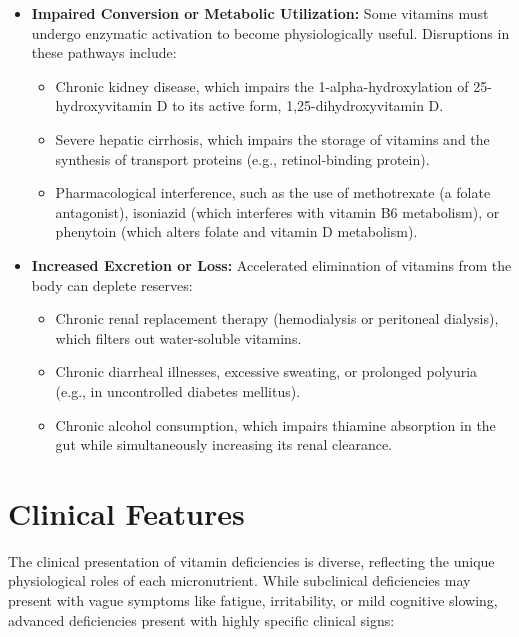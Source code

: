 \begin{itemize}
    \item \textbf{Impaired Conversion or Metabolic Utilization:} Some vitamins must undergo enzymatic activation to become physiologically useful. Disruptions in these pathways include:
    \begin{itemize}
        \item Chronic kidney disease, which impairs the 1-alpha-hydroxylation of 25-hydroxyvitamin D to its active form, 1,25-dihydroxyvitamin D.
        \item Severe hepatic cirrhosis, which impairs the storage of vitamins and the synthesis of transport proteins (e.g., retinol-binding protein).
        \item Pharmacological interference, such as the use of methotrexate (a folate antagonist), isoniazid (which interferes with vitamin B6 metabolism), or phenytoin (which alters folate and vitamin D metabolism).
    \end{itemize}

    \item \textbf{Increased Excretion or Loss:} Accelerated elimination of vitamins from the body can deplete reserves:
    \begin{itemize}
        \item Chronic renal replacement therapy (hemodialysis or peritoneal dialysis), which filters out water-soluble vitamins.
        \item Chronic diarrheal illnesses, excessive sweating, or prolonged polyuria (e.g., in uncontrolled diabetes mellitus).
        \item Chronic alcohol consumption, which impairs thiamine absorption in the gut while simultaneously increasing its renal clearance.
    \end{itemize}
\end{itemize}

\section*{Clinical Features}
The clinical presentation of vitamin deficiencies is diverse, reflecting the unique physiological roles of each micronutrient. While subclinical deficiencies may present with vague symptoms like fatigue, irritability, or mild cognitive slowing, advanced deficiencies present with highly specific clinical signs:

